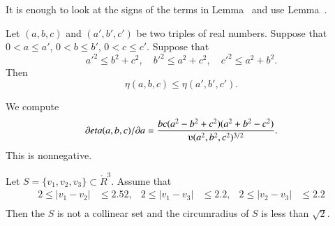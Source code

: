\begin{tarskidata}
\begin{tarski}

\begin{proved} It is enough to look at the signs of the terms in
Lemma~ and use Lemma~.
\swallowed\end{proved}
\end{tarski}





\begin{tarski}

\begin{lemma}
Let $(a,b,c)$ and $(a',b',c')$ be two triples of real numbers.
Suppose that $0 < a\le a'$, $0 < b\le b'$, $0< c\le c'$.  Suppose that
   $$
   a'^2 \le b^2 + c^2,\quad b'^2 \le a^2 + c^2,\quad c'^2\le a^2 + b^2.
   $$
Then
   $$
   \eta(a,b,c) \le \eta(a',b',c').
   $$
\end{lemma}


\begin{proved} We compute
	$$\partial\eta(a,b,c)/\partial a = 
        \frac{b c (a^2 - b^2 + c^2)(a^2 + b^2 - c^2)}{\ups(a^2,b^2,c^2)^{3/2}}.
	$$
This is nonnegative.  
\swallowed\end{proved}
\end{tarski}





\begin{tarski}

\begin{lemma}
Let $S=\{v_1,v_2,v_3\}\subset\ring{R}^3$.
Assume that
	$$
	\begin{array}{rlrlrl}
		2\le|v_1-v_2|&\le 2.52, &2\le|v_1-v_3|&\le 2.2, &2\le|v_2-v_3|&\le 2.2\\
	\end{array}
	$$
Then the $S$ is not a collinear set and the circumradius of 
$S$ is less than $\sqrt2$.
\end{lemma}


\end{tarski}
\end{tarskidata}
